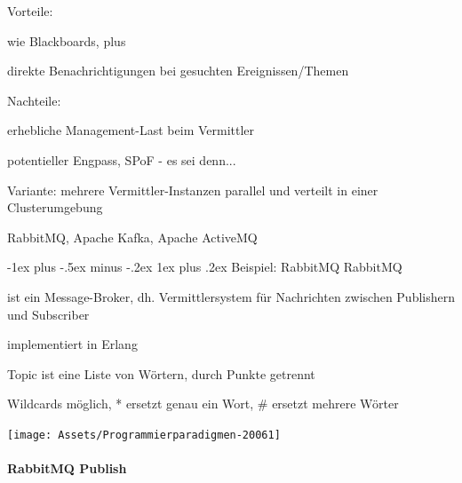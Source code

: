 \documentclass[10pt]{article}
\makeatletter
\renewcommand{\subsubsection}{\@startsection{subsubsection}{3}{0mm}%
                                {-1ex plus -.5ex minus -.2ex}%
                                {1ex plus .2ex}%
                                {\normalfont\small\bfseries}}
\makeatother
\begin{document}
\begin{itemize*}
  \item Vorteile:
  \begin{itemize*}
    \item wie Blackboards, plus
    \item direkte Benachrichtigungen bei gesuchten Ereignissen/Themen
  \end{itemize*}
  \item Nachteile:
  \begin{itemize*}
    \item erhebliche Management-Last beim Vermittler
    \begin{itemize*}
      \item potentieller Engpass, SPoF - es sei denn...
    \end{itemize*}
  \end{itemize*}
  Variante: mehrere Vermittler-Instanzen parallel und verteilt in einer Clusterumgebung
  \begin{itemize*}
    \item RabbitMQ, Apache Kafka, Apache ActiveMQ
  \end{itemize*}
\end{itemize*}

\subsubsection{Beispiel: RabbitMQ}
RabbitMQ
\begin{itemize*}
  \item ist ein Message-Broker, dh. Vermittlersystem für Nachrichten zwischen Publishern und Subscriber
  \item implementiert in Erlang
  \begin{itemize*}
    \item Topic ist eine Liste von Wörtern, durch Punkte getrennt
    \item Wildcards möglich, * ersetzt genau ein Wort, \# ersetzt mehrere Wörter
  \end{itemize*}
\end{itemize*}
\begin{center}
  \centering
  \texttt{[image: Assets/Programmierparadigmen-20061]}
\end{center}

\paragraph{RabbitMQ Publish}
\end{document}
